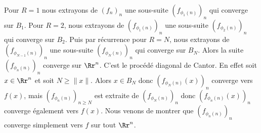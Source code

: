 {\begin{enumerate}
{Pour $R=1$ nous extrayons de $(f_n)_n$ une sous-suite $(f_{\phi_1(n)})_n$ qui converge sur $B_1$.
Pour $R=2$, nous extrayons de  $(f_{\phi_1(n)})_n$ une sous-suite $(f_{\phi_2(n)})_n$  qui converge sur $B_2$.
Puis par récurrence pour $R=N$, nous extrayons de  $(f_{\phi_{N-1}(n)})_n$ une sous-suite $(f_{\phi_N(n)})_n$  
qui converge sur $B_N$. 
Alors la suite $(f_{\phi_n(n)})_n$ converge sur $\Rr^n$. C'est le procédé diagonal de Cantor.
En effet soit $x\in \Rr^n$ et soit  $N \ge \|x\|$. Alors
$x \in B_N$ donc  $(f_{\phi_N(n)}(x))_n$ converge vers $f(x)$, mais 
$(f_{\phi_n(n)})_{n\ge N}$ est extraite de $(f_{\phi_N(n)})_n$
donc  $(f_{\phi_n(n)}(x))_{n}$ converge également vers $f(x)$.
Nous venons de montrer que  $(f_{\phi_n(n)})_n$ converge simplement vers $f$
sur tout $\Rr^n$.
}
\end{enumerate}
}
